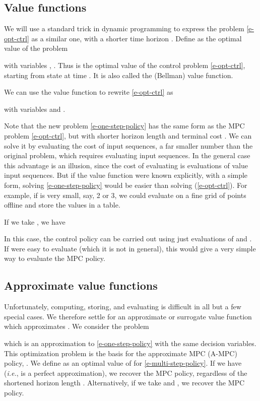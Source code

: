 \documentclass[12pt]{article}
\newcommand{\ie}{{\it i.e.}}
\begin{document}
\subsection{Value functions}
\label{s-value-functions}

We will use a standard trick in dynamic programming to express
the problem \eqref{e-opt-ctrl} as a similar one, with a shorter
time horizon .
Define  as the optimal value of the problem

with variables 
, .
Thus  is the optimal value of the control 
problem \eqref{e-opt-ctrl},
starting from state  at time .
It is also called the (Bellman) value function.



We can use the value function to rewrite \eqref{e-opt-ctrl} as

with variables  and 
.

Note that the new problem \eqref{e-one-step-policy}
has the same form as the MPC problem \eqref{e-opt-ctrl},
but with shorter horizon length  and terminal cost .
We can solve it by evaluating the cost of  input sequences,
a far smaller number than the original problem, which requires evaluating
 input sequences.
In the general case this advantage is an illusion, since 
the cost of evaluating  is  
evaluations of value input sequences.
But if the value function  were known explicitly,
with a simple form, solving \eqref{e-one-step-policy}
would be easier than solving (\ref{e-opt-ctrl}).
For example, if  is very small, say, 2 or 3, we could evaluate 
 on a fine grid of points offline and store the values
in a table.


If we take , we have

In this case, the control policy can be carried out 
using just  evaluations of  and .
If  were easy to evaluate (which it is not in general), this 
would give a very simple way to evaluate the MPC policy.



\subsection{Approximate value functions}
Unfortunately, computing, storing, and evaluating 
is difficult in all but a few special cases.
We therefore settle for an approximate or surrogate value 
function  which approximates .
We consider the problem

which is an approximation to \eqref{e-one-step-policy} 
with the same decision variables.
This optimization problem is the basis for the approximate MPC (A-MPC)
policy, .
We define  as an optimal value of 
for \eqref{e-multi-step-policy}.
If we have 
(\ie,  is a perfect approximation),
we recover the MPC policy,
regardless of the shortened horizon length .
Alternatively, if we take  and , 
we recover the MPC policy.
\end{document}
